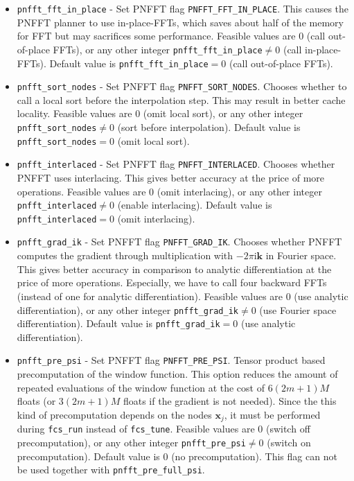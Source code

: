 \begin{itemize}
  \item \verb!pnfft_fft_in_place! -
    Set PNFFT flag \verb!PNFFT_FFT_IN_PLACE!. This causes the PNFFT planner to use in-place-FFTs, which saves about half of the memory for FFT but may sacrifices some performance.
    Feasible values are $0$ (call out-of-place FFTs), or any other integer \verb!pnfft_fft_in_place!$\ne0$ (call in-place-FFTs).
    Default value is \verb!pnfft_fft_in_place!$=0$ (call out-of-place FFTs).
  \item \verb!pnfft_sort_nodes! -
    Set PNFFT flag \verb!PNFFT_SORT_NODES!. Chooses whether to call a local sort before the interpolation step. This may result in better cache locality.
    Feasible values are $0$ (omit local sort), or any other integer \verb!pnfft_sort_nodes!$\ne0$ (sort before interpolation).
    Default value is \verb!pnfft_sort_nodes!$=0$ (omit local sort).
  \item \verb!pnfft_interlaced! -
    Set PNFFT flag \verb!PNFFT_INTERLACED!. Chooses whether PNFFT uses interlacing. This gives better accuracy at the price of more operations.
    Feasible values are $0$ (omit interlacing), or any other integer \verb!pnfft_interlaced!$\ne0$ (enable interlacing).
    Default value is \verb!pnfft_interlaced!$=0$ (omit interlacing).
  \item \verb!pnfft_grad_ik! -
    Set PNFFT flag \verb!PNFFT_GRAD_IK!. Chooses whether PNFFT computes the gradient through multiplication with $-2\pi\textrm{i}\mathbf{k}$ in Fourier space.
    This gives better accuracy in comparison to analytic differentiation at the price of more operations. Especially, we have to call four backward FFTs (instead of one for analytic differentiation).
    Feasible values are $0$ (use analytic differentiation), or any other integer \verb!pnfft_grad_ik!$\ne0$ (use Fourier space differentiation).
    Default value is \verb!pnfft_grad_ik!$=0$ (use analytic differentiation).
  \item \verb!pnfft_pre_psi! -
    Set PNFFT flag \verb!PNFFT_PRE_PSI!. Tensor product based precomputation of the window function. This option reduces the amount of repeated evaluations of the window function at the cost of
    $6(2m+1)M$ floats (or $3(2m+1)M$ floats if the gradient is not needed).
    Since the this kind of precomputation depends on the nodes $\mathbf x_j$, it must be performed during \verb!fcs_run! instead of \verb!fcs_tune!.
    Feasible values are $0$ (switch off precomputation), or any other integer \verb!pnfft_pre_psi!$\ne0$ (switch on precomputation).
    Default value is $0$ (no precomputation). This flag can not be used together with \verb!pnfft_pre_full_psi!.

\end{itemize}
